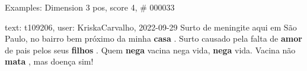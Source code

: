 \begin{frame}{Examples: Dimension 3 pos, score 4, \# 000033}
\footnotesize
\begin{exampleblock}{text: t109206, user: KriskaCarvalho, 2022-09-29}
Surto de meningite aqui em São Paulo, no bairro bem próximo da minha 
\textbf{casa} . Surto causado pela falta de \textbf{amor} de pais pelos seus 
\textbf{filhos} . Quem \textbf{nega} vacina nega vida, \textbf{nega} vida. 
Vacina não \textbf{mata} , mas doença sim! 
\end{exampleblock}
\end{frame}
